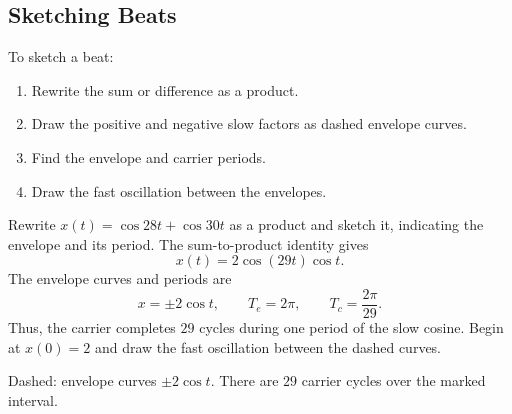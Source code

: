 \documentclass[10pt,letterpaper]{article}
\begin{document}
\subsection{Sketching Beats}

To sketch a beat:
\begin{enumerate}
    \item Rewrite the sum or difference as a product.
    \item Draw the positive and negative slow factors
    as dashed envelope curves.
    \item Find the envelope and carrier periods.
    \item Draw the fast oscillation between the envelopes.
\end{enumerate}

\begin{example}[3]{
Rewrite $x(t)=\cos28t+\cos30t$ as a product and sketch
it, indicating the envelope and its period.
}
The sum-to-product identity gives
\[
x(t)=2\cos(29t)\cos t.
\]
The envelope curves and periods are
\[
x=\pm2\cos t,\qquad
T_e=2\pi,\qquad T_c=\frac{2\pi}{29}.
\]
Thus, the carrier completes $29$ cycles during one
period of the slow cosine. Begin at $x(0)=2$ and
draw the fast oscillation between the dashed curves.

\begin{center}

\small
Dashed: envelope curves $\pm2\cos t$.
There are $29$ carrier cycles over the marked interval.
\end{center}
\end{example}
\end{document}
